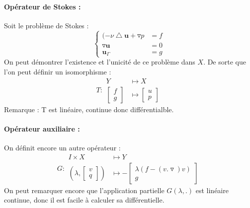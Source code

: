 \documentclass{book}
\begin{document}
\paragraph{Opérateur de Stokes :}
Soit le problème de Stokes :
\[
\left\{
\begin{array}{rl}
(-\nu \bigtriangleup \textbf{u} + \triangledown p & =f \\
\triangledown \textbf{u} & =0 \\
\textbf{u}_\Gamma &=g 
\end{array}\right.
\]
On peut démontrer l'existence et l'unicité de ce problème dans $X$. De sorte que l'on peut définir un isomorphisme :
\[T : 
\begin{array}{rl}
Y &\longmapsto X \\
 \left[\begin{array}{ll}f\\g\end{array}\right] &\longmapsto \left[\begin{array}{ll}u\\p\end{array}\right]
\end{array}
\]
Remarque : T est linéaire, continue donc différentialble.
\paragraph{Opérateur auxiliaire :}
On définit encore un autre opérateur :
\[G : 
\begin{array}{rl}
I \times X &\longmapsto Y \\
 ( \lambda, \left[\begin{array}{ll}v\\q\end{array}\right] ) &\longmapsto -\left[\begin{array}{cc}\lambda(f-(v.\triangledown)v)\\g\end{array}\right]
\end{array}
\]
On peut remarquer encore que l'application partielle $G(\lambda,.)$ est linéaire continue, donc il est facile à calculer sa différentielle. 
\end{document}

